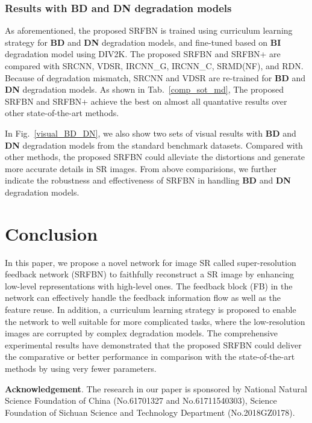 \documentclass[10pt,twocolumn,letterpaper]{article}
\begin{document}
	\subsubsection{Results with BD and DN degradation models}
	\label{4.5.3}
	As aforementioned, the proposed SRFBN is trained using curriculum learning strategy for \textbf{BD} and \textbf{DN} degradation models, and fine-tuned based on \textbf{BI} degradation model using DIV2K. The proposed SRFBN and SRFBN+ are compared with SRCNN\cite{dong2016image}, VDSR\cite{Kim_2016_CVPR}, IRCNN\_G\cite{DBLP:conf/cvpr/ZhangZGZ17}, IRCNN\_C\cite{DBLP:conf/cvpr/ZhangZGZ17}, SRMD(NF)\cite{Zhang2017Learning}, and RDN\cite{Zhang_2018_CVPR}. Because of degradation mismatch, SRCNN and VDSR are re-trained for \textbf{BD} and \textbf{DN} degradation models. As shown in Tab.~\ref{comp_sot_md}, The proposed SRFBN and SRFBN+ achieve the best on almost all quantative results over other state-of-the-art methods.
	
	In Fig.~\ref{visual_BD_DN}, we also show two sets of visual results with \textbf{BD} and \textbf{DN} degradation models from the standard benchmark datasets. Compared with other methods, the proposed SRFBN could alleviate the distortions and generate more accurate details in SR images. From above comparisions, we further indicate the robustness and effectiveness of SRFBN in handling \textbf{BD} and \textbf{DN} degradation models. 

	\section{Conclusion}
	In this paper, we propose a novel network for image SR called super-resolution feedback network (SRFBN) to faithfully reconstruct a SR image by enhancing low-level representations with high-level ones. The feedback block (FB) in the network can effectively handle the feedback information flow as well as the feature reuse. In addition, a curriculum learning strategy is proposed to enable the network to well suitable for more complicated tasks, where the low-resolution images are corrupted by complex degradation models. The comprehensive experimental results have demonstrated that the proposed SRFBN could deliver the comparative or better performance in comparison with the state-of-the-art methods by using very fewer parameters. 
	\newline
	
	\noindent\textbf{Acknowledgement}. The research in our paper is sponsored by National Natural Science Foundation of China (No.61701327 and No.61711540303), Science Foundation of Sichuan Science and Technology Department (No.2018GZ0178).
	\clearpage
	{\small
		
		
	}
\end{document}
